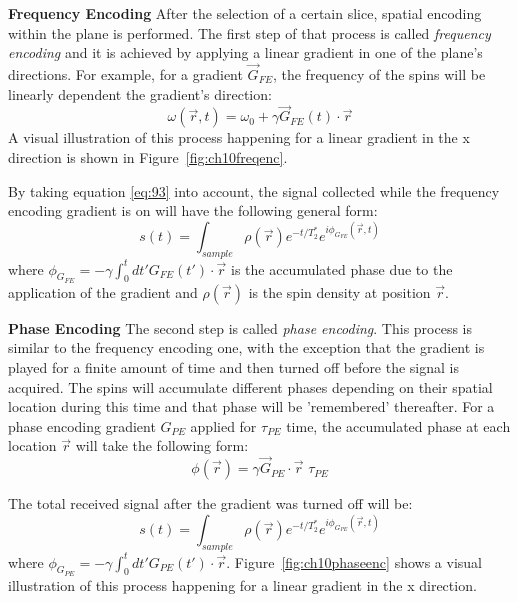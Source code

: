 \hfill

\textbf{Frequency Encoding} After the selection of a certain slice, spatial encoding within the plane is performed. 
The first step of that process is called \textit{frequency encoding} and it is achieved by applying a linear gradient in one of the plane's directions.
For example, for a gradient $\vec{G}_{FE}$, the frequency of the spins will be linearly dependent the gradient's direction:
\begin{equation}
    \omega(\vec{r},t) = \omega_0 + \gamma \vec{G}_{FE}(t) \cdot \vec{r}
\end{equation}
A visual illustration of this process happening for a linear gradient in the x direction is shown in Figure~\ref{fig:ch10freqenc}.

\hfill

By taking equation \ref{eq:93} into account, the signal collected while the frequency encoding gradient is on will have the following general form:
\begin{equation}
    s(t) = \int_{sample} \rho(\vec{r}) e^{-t/T_2^*} e^{i \phi_{G_{FE}}(\vec{r}, t)}
\end{equation}
where $\phi_{G_{FE}} = - \gamma \int_{0}^{t} dt' G_{FE}(t') \cdot \vec{r}$ is the accumulated phase due to the application of the gradient and $\rho(\vec{r})$ is the spin density at position $\vec{r}$. 

\hfill

\textbf{Phase Encoding} The second step is called \textit{phase encoding}.
This process is similar to the frequency encoding one, with the exception that the gradient is played for a finite amount of time and then turned off before the signal is acquired. 
The spins will accumulate different phases depending on their spatial location during this time and that phase will be 'remembered' thereafter.
For a phase encoding gradient $G_{PE}$ applied for $\tau_{PE}$ time, the accumulated phase at each location $\vec{r}$ will take the following form:
\begin{equation}
    \phi(\vec{r}) = \gamma \vec{G}_{PE} \cdot \vec{r} \, \, \tau_{PE}
\end{equation}

The total received signal after the gradient was turned off will be:
\begin{equation}
    s(t) = \int_{sample} \rho(\vec{r}) e^{-t/T_2^*} e^{i \phi_{G_{PE}}(\vec{r}, t)}
\end{equation}
where $\phi_{G_{PE}} = - \gamma \int_{0}^{t} dt' G_{PE}(t') \cdot \vec{r}$. 
Figure~\ref{fig:ch10phaseenc} shows a visual illustration of this process happening for a linear gradient in the x direction.

